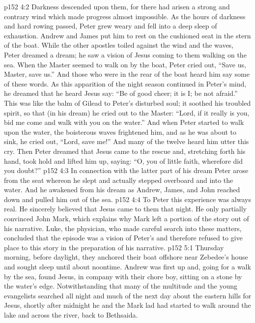 \vs p152 4:2 Darkness descended upon them, for there had arisen a strong and contrary wind which made progress almost impossible. As the hours of darkness and hard rowing passed, Peter grew weary and fell into a deep sleep of exhaustion. Andrew and James put him to rest on the cushioned seat in the stern of the boat. While the other apostles toiled against the wind and the waves, Peter dreamed a dream; he saw a vision of Jesus coming to them walking on the sea. When the Master seemed to walk on by the boat, Peter cried out, “Save us, Master, save us.” And those who were in the rear of the boat heard him say some of these words. As this apparition of the night season continued in Peter’s mind, he dreamed that he heard Jesus say: “Be of good cheer; it is I; be not afraid.” This was like the balm of Gilead to Peter’s disturbed soul; it soothed his troubled spirit, so that (in his dream) he cried out to the Master: “Lord, if it really is you, bid me come and walk with you on the water.” And when Peter started to walk upon the water, the boisterous waves frightened him, and as he was about to sink, he cried out, “Lord, save me!” And many of the twelve heard him utter this cry. Then Peter dreamed that Jesus came to the rescue and, stretching forth his hand, took hold and lifted him up, saying: “O, you of little faith, wherefore did you doubt?”
\vs p152 4:3 In connection with the latter part of his dream Peter arose from the seat whereon he slept and actually stepped overboard and into the water. And he awakened from his dream as Andrew, James, and John reached down and pulled him out of the sea.
\vs p152 4:4 To Peter this experience was always real. He sincerely believed that Jesus came to them that night. He only partially convinced John Mark, which explains why Mark left a portion of the story out of his narrative. Luke, the physician, who made careful search into these matters, concluded that the episode was a vision of Peter’s and therefore refused to give place to this story in the preparation of his narrative.\plusone
{}
\vs p152 5:1 Thursday morning, before daylight, they anchored their boat offshore near Zebedee’s house and sought sleep until about noontime. Andrew was first up and, going for a walk by the sea, found Jesus, in company with their chore boy, sitting on a stone by the water’s edge. Notwithstanding that many of the multitude and the young evangelists searched all night and much of the next day about the eastern hills for Jesus, shortly after midnight he and the Mark lad had started to walk around the lake and across the river, back to Bethsaida.
